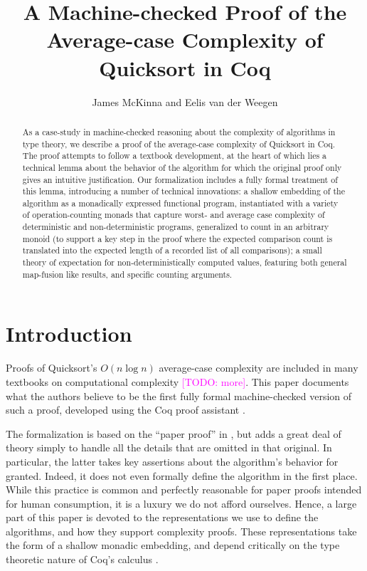 \documentclass[runningheads]{llncs}
\newcommand{\todo}[1]{\textcolor{magenta}{[TODO: #1]}}
\begin{document}
\nocite{*}

\title{A Machine-checked Proof of the Average-case Complexity of Quicksort in Coq}

\authorrunning{\em}
\titlerunning{\em}

\author{James McKinna and Eelis van der Weegen}


\maketitle

\begin{abstract}
As a case-study in machine-checked reasoning about the complexity of algorithms in type theory, we describe a proof of the average-case complexity of Quicksort in Coq.
The proof attempts to follow a textbook development, at the heart of which lies a technical lemma about the behavior of the algorithm for which the original proof only gives an intuitive justification.
Our formalization includes a fully formal treatment of this lemma, introducing a number of technical innovations:
a shallow embedding of the algorithm as a monadically expressed functional program, instantiated with a variety of operation-counting monads that capture worst- and average case complexity of deterministic and non-deterministic programs, generalized to count in an arbitrary monoid (to support a key step in the proof where the expected comparison count is translated into the expected length of a recorded list of all comparisons);
a small theory of expectation for non-deterministically computed values, featuring both general map-fusion like results, and specific counting arguments.
\end{abstract}

\section{Introduction}

Proofs of Quicksort's $O(n \log n)$ average-case complexity are included in many textbooks on computational complexity \cite{introtoalgos} \todo{more}. This paper documents what the authors believe to be the first fully formal machine-checked version of such a proof, developed using the Coq proof assistant \cite{coq}.

The formalization is based on the ``paper proof'' in \cite{introtoalgos}, but adds a great deal of theory simply to handle all the details that are omitted in that original. In particular, the latter takes key assertions about the algorithm's behavior for granted. Indeed, it does not even formally define the algorithm in the first place. While this practice is common and perfectly reasonable for paper proofs intended for human consumption, it is a luxury we do not afford ourselves. Hence, a large part of this paper is devoted to the representations we use to define the algorithms, and how they support complexity proofs. These representations take the form of a shallow monadic embedding, and depend critically on the type theoretic nature of Coq's calculus \cite{coq'art}.
\end{document}
